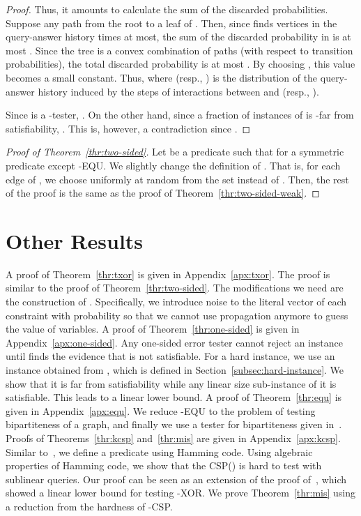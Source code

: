 \documentclass[letterpaper,11pt]{article}
\newcommand{\kcsp}{\textsf{-CSP}\xspace}
\newcommand{\csp}[1]{\textsf{CSP}(#1)\xspace}
\newcommand{\xor}{\textsf{XOR}\xspace}
\newcommand{\kequ}{-\textsf{EQU}\xspace}
\begin{document}
\begin{proof}
  Thus, it amounts to calculate the sum of the discarded probabilities.
  Suppose any path  from the root to a leaf of .
  Then, since  finds vertices in the query-answer history  times at most,
  the sum of the discarded probability in  is at most .
  Since the tree is a convex combination of paths (with respect to transition probabilities),
  the total discarded probability is at most .
  By choosing , this value becomes a small constant.
  Thus,  where  (resp., ) is the distribution of the query-answer history induced by the  steps of interactions between  and  (resp., ).

  Since  is a -tester, 
  .
  On the other hand, 
  since a  fraction of instances of  is -far from satisfiability,
  .
  This is, however, a contradiction since .
\end{proof}

\begin{proof}[Proof of Theorem~\ref{thr:two-sided}]
Let  be a predicate such that  for a symmetric predicate  except \kequ.
We slightly change the definition of .
That is, for each edge  of ,
we choose  uniformly at random from the set  instead of .
Then, the rest of the proof is the same as the proof of Theorem~\ref{thr:two-sided-weak}.
\end{proof}

\section{Other Results}\label{sec:other}
A proof of Theorem~\ref{thr:txor} is given in Appendix~\ref{apx:txor}.
The proof is similar to the proof of Theorem~\ref{thr:two-sided}.
The modifications we need are the construction of .
Specifically, 
we introduce noise to the literal vector of each constraint with probability  so that we cannot use propagation anymore to guess the value of variables.
A proof of Theorem~\ref{thr:one-sided} is given in Appendix~\ref{apx:one-sided}.
Any one-sided error tester  cannot reject an instance  until  finds the evidence that  is not satisfiable.
For a hard instance, 
we use an instance obtained from , which is defined in Section~\ref{subsec:hard-instance}.
We show that it is far from satisfiability while any linear size sub-instance of it is satisfiable.
This leads to a linear lower bound.
A proof of Theorem~\ref{thr:equ} is given in Appendix~\ref{apx:equ}.
We reduce \kequ to the problem of testing bipartiteness of a graph,
and finally we use a tester for bipartiteness given in~\cite{GR99}.
Proofs of Theorems~\ref{thr:kcsp} and~\ref{thr:mis} are given in Appendix~\ref{apx:kcsp}.
Similar to~\cite{Tul09}, 
we define a predicate  using Hamming code.
Using algebraic properties of Hamming code, 
we show that the \csp{} is hard to test with sublinear queries.
Our proof can be seen as an extension of the proof of~\cite{BOT02}, 
which showed a linear lower bound for testing -\xor.
We prove Theorem~\ref{thr:mis} using a reduction from the hardness of \kcsp.
\end{document}
